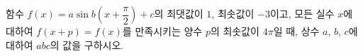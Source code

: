 함수 $f(x)=a\sin b\left(x+\dfrac{\pi}{2}\right)+c$의 최댓값이 $1$, 최솟값이 \mbox{$-3$이고}, 모든 실수 $x$에 대하여 $f(x+p)=f(x)$를 만족시키는 양수 $p$의 최솟값이 $4\pi$일 때, 상수 $a$, $b$, $c$에 대하여 $abc$의 값을 구하시오. 
